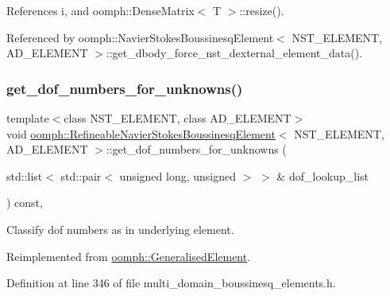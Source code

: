 References i, and oomph\+::\+Dense\+Matrix$<$ T $>$\+::resize().



Referenced by oomph\+::\+Navier\+Stokes\+Boussinesq\+Element$<$ N\+S\+T\+\_\+\+E\+L\+E\+M\+E\+N\+T, A\+D\+\_\+\+E\+L\+E\+M\+E\+N\+T $>$\+::get\+\_\+dbody\+\_\+force\+\_\+nst\+\_\+dexternal\+\_\+element\+\_\+data().

\mbox{\label{classoomph_1_1RefineableNavierStokesBoussinesqElement_aab581709145cc3e9a4da5c5417d1c50f}} 
\subsubsection{\texorpdfstring{get\+\_\+dof\+\_\+numbers\+\_\+for\+\_\+unknowns()}{get\_dof\_numbers\_for\_unknowns()}}
{\footnotesize\ttfamily template$<$class N\+S\+T\+\_\+\+E\+L\+E\+M\+E\+NT, class A\+D\+\_\+\+E\+L\+E\+M\+E\+NT$>$ \\
void \hyperlink{classoomph_1_1RefineableNavierStokesBoussinesqElement}{oomph\+::\+Refineable\+Navier\+Stokes\+Boussinesq\+Element}$<$ N\+S\+T\+\_\+\+E\+L\+E\+M\+E\+NT, A\+D\+\_\+\+E\+L\+E\+M\+E\+NT $>$\+::get\+\_\+dof\+\_\+numbers\+\_\+for\+\_\+unknowns (\begin{DoxyParamCaption}\item[{std\+::list$<$ std\+::pair$<$ unsigned long, unsigned $>$ $>$ \&}]{dof\+\_\+lookup\+\_\+list }\end{DoxyParamCaption}) const\hspace{0.3cm}{\ttfamily [inline]}, {\ttfamily [virtual]}}



Classify dof numbers as in underlying element. 



Reimplemented from \hyperlink{classoomph_1_1GeneralisedElement_a069f59bfc3e607a5bebba52c6314d777}{oomph\+::\+Generalised\+Element}.



Definition at line 346 of file multi\+\_\+domain\+\_\+boussinesq\+\_\+elements.\+h.

